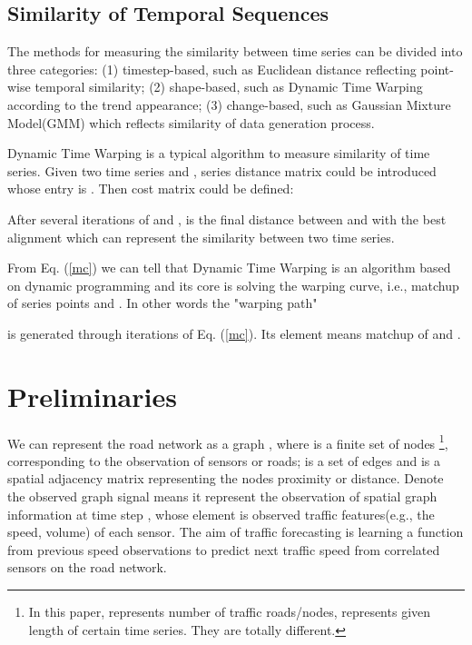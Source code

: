 \documentclass[letterpaper]{article} \usepackage{aaai21}  \usepackage{times}  \usepackage{helvet} \usepackage{courier}  \usepackage[hyphens]{url}  \usepackage{graphicx} \urlstyle{rm} \def\UrlFont{\rm}  \usepackage{natbib}  \usepackage{caption} \frenchspacing  \setlength{\pdfpagewidth}{8.5in}  \setlength{\pdfpageheight}{11in}  \usepackage{multirow}
\begin{document}
\subsection{Similarity of Temporal Sequences}
The methods for measuring the similarity between time series can be divided into three categories: (1) timestep-based, such as Euclidean distance reflecting point-wise temporal similarity; (2) shape-based, such as Dynamic Time Warping \cite{berndt1994using} according to the trend appearance; (3) change-based, such as Gaussian Mixture Model(GMM) \cite{povinelli2004time} which reflects similarity of data generation process. 

Dynamic Time Warping is a typical algorithm to measure similarity of time series. Given two time series  and , series distance matrix \bm{} could be introduced whose entry is . Then cost matrix \bm{} could be defined:
\begin{small}
	
\end{small}

After several iterations of  and ,  is the final distance between  and  with the best alignment which can represent the similarity between two time series.

From Eq. (\ref{mc}) we can tell that Dynamic Time Warping is an algorithm based on dynamic programming and its core is solving the warping curve, i.e., matchup of series points  and . In other words the "warping path" \bm{}

is generated through iterations of Eq. (\ref{mc}). Its element  means matchup of  and .

\section{Preliminaries}
We can represent the road network as a graph , where  is a finite set of nodes \footnote{In this paper,  represents number of traffic roads/nodes,  represents given length of certain time series. They are totally different.}, corresponding to the observation of  sensors or roads;  is a set of edges and  is a spatial adjacency matrix representing the nodes proximity or distance. Denote the observed graph signal  means it represent the observation of spatial graph information  at time step , whose element is observed  traffic features(e.g., the speed, volume) of each sensor. The aim of traffic forecasting is learning a function  from previous  speed observations to predict next  traffic speed from  correlated sensors on the road network.
\end{document}
